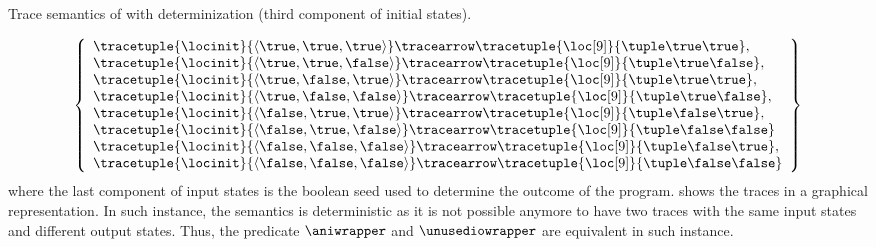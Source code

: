 \begin{example}
\begin{marginfigure}[*5]
  \caption{Trace semantics of  with determinization (third component of initial states).}
\end{marginfigure}
  \begin{eqnarray*}
    \left\{
      \begin{array}{l}
        \tracetuple{\locinit}{\langle{\true,\true,\true}\rangle}\tracearrow\tracetuple{\loc[9]}{\tuple\true\true}, \\
        \tracetuple{\locinit}{\langle{\true,\true,\false}\rangle}\tracearrow\tracetuple{\loc[9]}{\tuple\true\false}, \\
        \tracetuple{\locinit}{\langle{\true,\false,\true}\rangle}\tracearrow\tracetuple{\loc[9]}{\tuple\true\true}, \\
        \tracetuple{\locinit}{\langle{\true,\false,\false}\rangle}\tracearrow\tracetuple{\loc[9]}{\tuple\true\false}, \\
        \tracetuple{\locinit}{\langle{\false,\true,\true}\rangle}\tracearrow\tracetuple{\loc[9]}{\tuple\false\true}, \\
        \tracetuple{\locinit}{\langle{\false,\true,\false}\rangle}\tracearrow\tracetuple{\loc[9]}{\tuple\false\false} \\
        \tracetuple{\locinit}{\langle{\false,\false,\false}\rangle}\tracearrow\tracetuple{\loc[9]}{\tuple\false\true}, \\
        \tracetuple{\locinit}{\langle{\false,\false,\false}\rangle}\tracearrow\tracetuple{\loc[9]}{\tuple\false\false}
      \end{array}
    \right\}
  \end{eqnarray*}
  where the last component of input states is the boolean seed used to determine the outcome of the program.
   shows the traces in a graphical representation.
  In such instance, the semantics is deterministic as it is not possible anymore to have two traces with the same input states and different output states.
  Thus, the predicate $\aniwrapper$ and $\unusediowrapper$ are equivalent in such instance.
\end{example}

